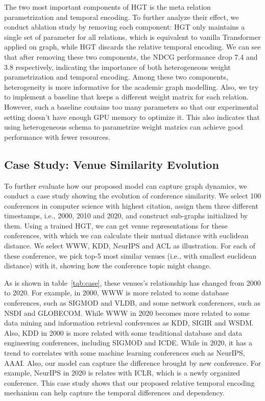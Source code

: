 \documentclass[sigconf]{acmart}
\theoremstyle{definition}
\begin{document}
{The two most important components of HGT is the meta relation parametrization and temporal encoding. To further analyze their effect, we conduct ablation study by removing each component: HGT only maintains a single set of parameter for all relations, which is equivalent to vanilla Transformer applied on graph, while HGT discards the relative temporal encoding. We can see that after removing these two components, the NDCG performance drop 7.4 and 3.8 respectively, indicating the importance of both heterogeneous weight parametrization and temporal encoding. Among these two components, heterogeneity is more informative for the academic graph modelling. Also, we try to implement a baseline that keeps a different weight matrix for each relation. However, such a baseline contains too many parameters so that our experimental setting doesn't have enough GPU memory to optimize it. This also indicates that using heterogeneous schema to parametrize weight matrics can achieve good performance with fewer resources.

\subsection{Case Study: Venue Similarity Evolution}

To further evaluate how our proposed model can capture graph dynamics, we conduct a case study showing the evolution of conference similarity. We select 100 conferences in computer science with highest citation, assign them three different timestamps, i.e., 2000, 2010 and 2020, and construct sub-graphs initialized by them. Using a trained HGT, we can get venue representations for these conferences, with which we can calculate their mutual distance with euclidean distance. We select WWW, KDD, NeurIPS and ACL as illustration. For each of these conference, we pick top-5 most similar venues (i.e., with smallest euclidean distance) with it, showing how the conference topic might change. 

As is shown in table~\ref{tab:case}, these venues's relationship has changed from 2000 to 2020. For example, in 2000, WWW is more related to some database conferences, such as SIGMOD and VLDB, and some network conferences, such as NSDI and GLOBECOM. While WWW in 2020 becomes more related to some data mining and information retrieval conferences as KDD, SIGIR and WSDM. Also, KDD in 2000 is 
more related with some traditional database and data engineering conferences, including SIGMOD and ICDE. While in 2020, it has a trend to correlates with some machine learning conferences such as NeurIPS, AAAI. Also, our model can capture the difference brought by new conference. For example, NeurIPS in 2020 is relates with ICLR, which is a newly organized conference. This case study shows that our proposed relative temporal encoding mechanism can help capture the temporal differences and dependency.

}
\end{document}
